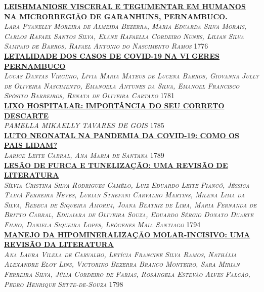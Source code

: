 \noindent \textsc{\hyperlink{trabalhos/250050.pdf.1}{\textbf{LEISHMANIOSE VISCERAL E TEGUMENTAR EM HUMANOS NA MICRORREGIÃO DE GARANHUNS, PERNAMBUCO.}}}\\ 
\noindent \textsc{\textit{Lara Pyanelly Moreira de Almeida Bezerra, Maria Eduarda Silva Morais, Carlos Rafael Santos Silva, Elâne Rafaella Cordeiro Nunes, Lilian Silva Sampaio de Barros, Rafael Antonio do Nascimento Ramos}} \hfill 1776\\ 

\noindent \textsc{\hyperlink{trabalhos/251471.pdf.1}{\textbf{LETALIDADE DOS CASOS DE COVID-19 NA VI GERES PERNAMBUCO}}}\\ 
\noindent \textsc{\textit{Lucas Dantas Virgínio, Lívia Maria Mateus de Lucena Barros, Giovanna Jully de Oliveira Nascimento, Emanoela Antunes da Silva, Emanoel Francisco Spósito Barreiros, Renata de Oliveira Cartaxo}} \hfill 1781\\ 

\noindent \textsc{\hyperlink{trabalhos/251445.pdf.1}{\textbf{LIXO HOSPITALAR: IMPORTÂNCIA DO SEU CORRETO DESCARTE}}}\\ 
\noindent \textsc{\textit{PAMELLA MIKAELLY TAVARES DE GOIS}} \hfill 1785\\ 

\noindent \textsc{\hyperlink{trabalhos/251649.pdf.1}{\textbf{LUTO NEONATAL NA PANDEMIA DA COVID-19: COMO OS PAIS LIDAM?}}}\\ 
\noindent \textsc{\textit{Larice Leite Cabral, Ana Maria de Santana}} \hfill 1789\\ 

\noindent \textsc{\hyperlink{trabalhos/249863.pdf.1}{\textbf{LESÃO DE FURCA E TUNELIZAÇÃO: UMA REVISÃO DE LITERATURA}}}\\ 
\noindent \textsc{\textit{Sílvia Cristina Silva Rodrigues Camêlo, Luiz Eduardo Leite Piancó, Jéssica Tainá Ferreira Neves, Lurian Sthefani Carvalho Martins, Milena Lima da Silva, Rebeca de Siqueira Amorim, Joana Beatriz de Lima, Maria Fernanda de Britto Cabral, Ednaiara de Oliveira Souza, Eduardo Sérgio Donato Duarte Filho, Daniela Siqueira Lopes, Leógenes Maia Santiago}} \hfill 1794\\ 

\noindent \textsc{\hyperlink{trabalhos/251065.pdf.1}{\textbf{MANEJO DA HIPOMINERALIZAÇÃO MOLAR-INCISIVO: UMA REVISÃO DA LITERATURA}}}\\ 
\noindent \textsc{\textit{Ana Laura Vilela de Carvalho, Letícia Francine Silva Ramos, Nathália Alexandre Eloy Lins, Victorino Bezerra Branco Monteiro, Sara Mirian Ferreira Silva, Júlia Cordeiro de Farias, Rosângela Estevão Alves Falcão, Pedro Henrique Sette-de-Souza}} \hfill 1798\\ 


